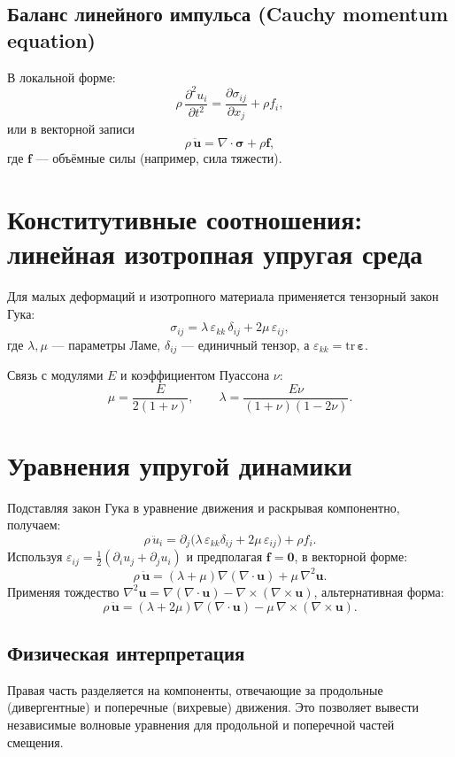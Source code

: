 \documentclass[12pt,a4paper]{article}
\begin{document}
\subsection*{Баланс линейного импульса (Cauchy momentum equation)}
В локальной форме:
\[
\rho\,\frac{\partial^2 u_i}{\partial t^2} = \frac{\partial \sigma_{ij}}{\partial x_j} + \rho f_i,
\]
или в векторной записи
\[
\rho\,\ddot{\mathbf{u}} = \nabla\!\cdot\boldsymbol{\sigma} + \rho\mathbf{f},
\]
где $\mathbf{f}$ --- объёмные силы (например, сила тяжести).

\section{Конститутивные соотношения: линейная изотропная упругая среда}
Для малых деформаций и изотропного материала применяется тензорный закон Гука:
\[
\sigma_{ij} = \lambda\,\varepsilon_{kk}\,\delta_{ij} + 2\mu\,\varepsilon_{ij},
\]
где $\lambda,\mu$ --- параметры Ламе, $\delta_{ij}$ --- единичный тензор, а $\varepsilon_{kk}=\mathrm{tr}\,\boldsymbol{\varepsilon}$.  

Связь с модулями $E$ и коэффициентом Пуассона $\nu$:
\[
\mu = \frac{E}{2(1+\nu)}, \qquad
\lambda = \frac{E\nu}{(1+\nu)(1-2\nu)}.
\]

\section{Уравнения упругой динамики}
Подставляя закон Гука в уравнение движения и раскрывая компонентно, получаем:
\[
\rho\,\ddot u_i = \partial_j\big(\lambda\,\varepsilon_{kk}\delta_{ij} + 2\mu\,\varepsilon_{ij}\big) + \rho f_i.
\]
Используя $\varepsilon_{ij}=\tfrac12(\partial_i u_j+\partial_j u_i)$ и предполагая $\mathbf{f}=\mathbf{0}$, в векторной форме:
\[
\rho\,\ddot{\mathbf{u}} = (\lambda + \mu)\nabla(\nabla\!\cdot\mathbf{u}) + \mu\,\nabla^2\mathbf{u}.
\]
Применяя тождество $\nabla^2\mathbf{u}=\nabla(\nabla\!\cdot\mathbf{u}) - \nabla\times(\nabla\times\mathbf{u})$, альтернативная форма:
\[
\rho\,\ddot{\mathbf{u}} = (\lambda + 2\mu)\nabla(\nabla\!\cdot\mathbf{u}) - \mu\,\nabla\times(\nabla\times\mathbf{u}).
\]

\subsection*{Физическая интерпретация}
Правая часть разделяется на компоненты, отвечающие за продольные (дивергентные) и поперечные (вихревые) движения. Это позволяет вывести независимые волновые уравнения для продольной и поперечной частей смещения.
\end{document}
